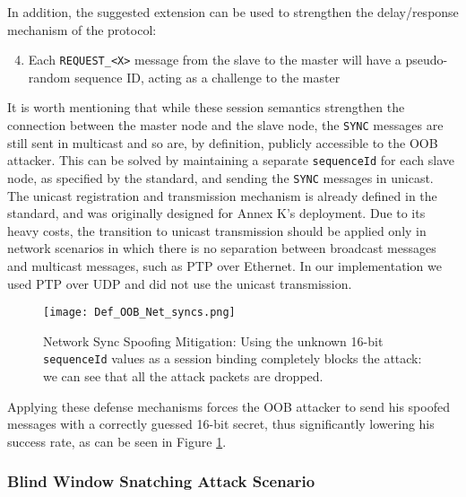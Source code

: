 \documentclass[11pt]{article}
\begin{document}
In addition, the suggested extension can be used to strengthen the delay/response mechanism of the protocol:

\begin{enumerate}

  \setcounter{enumi}{3}

  \item Each \texttt{REQUEST_<X>} message from the slave to the master will have a pseudo-random sequence ID, acting as a challenge to the master

\end{enumerate}



It is worth mentioning that while these session semantics strengthen the connection between the master node and the slave node, the \texttt{SYNC} messages are still sent in multicast and so are, by definition, publicly accessible to the OOB attacker. This can be solved by maintaining a separate \texttt{sequenceId} for each slave node, as specified by the standard, and sending the \texttt{SYNC} messages in unicast. The unicast registration and transmission mechanism is already defined in the standard, and was originally designed for Annex K's deployment. Due to its heavy costs, the transition to unicast transmission should be applied only in network scenarios in which there is no separation between broadcast messages and multicast messages, such as PTP over Ethernet. In our implementation we used PTP over UDP and did not use the unicast transmission.



\begin{figure}[t]

\centerline{\texttt{[image: Def\_OOB\_Net\_syncs.png]}}

\caption{Network Sync Spoofing Mitigation: Using the unknown 16-bit \texttt{sequenceId} values as a session binding completely blocks the attack: we can see that all the attack packets are dropped.}

\label{Def Net Syncs}

\end{figure}



Applying these defense mechanisms forces the OOB attacker to send his spoofed messages with a correctly guessed 16-bit secret, thus significantly lowering his success rate, as can be seen in Figure \ref{Def Net Syncs}.



\subsubsection{Blind Window Snatching Attack Scenario}\label{time:scenrio4}
\end{document}
